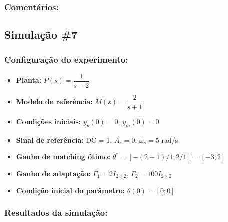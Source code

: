 \documentclass[10pt]{article}
\begin{document}
\subsubsection{Comentários:}

\newpage

\subsection{Simulação \#7}
\subsubsection{Configuração do experimento:}
\begin{itemize}
\item \textbf{Planta:} $P(s) = \dfrac{1}{s - 2}$
\item \textbf{Modelo de referência:} $M(s) = \dfrac{2}{s + 1}$
\item \textbf{Condições iniciais:} $y_p(0)=0$, $y_m(0)=0$
\item \textbf{Sinal de referência:} DC = 1, $A_s=0$, $\omega_s=5$ rad/s
\item \textbf{Ganho de matching ótimo:} $\theta^* = [-(2+1)/1;2/1] = [-3;2]$
\item \textbf{Ganho de adaptação:} $\Gamma_1 = 2I_{2\times2}$, $\Gamma_2 = 100I_{2\times2}$
\item \textbf{Condição inicial do parâmetro:} $\theta(0) = [0;0]$
\end{itemize}

\subsubsection{Resultados da simulação:}
\end{document}
